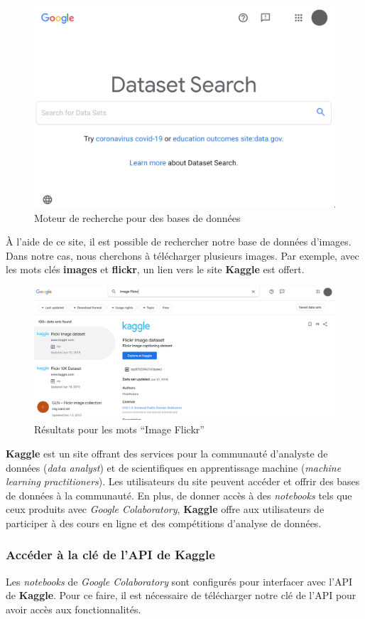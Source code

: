 \documentclass{article}
\begin{document}
\begin{figure}[H]
  \centering
  \includegraphics[width=0.5\columnwidth]{figures/googledataset}
  \caption{Moteur de recherche pour des bases de données}
  \label{fig:googleds}
\end{figure}

\bigbreak
À l'aide de ce site, il est possible de rechercher notre base de données d'images.
\bigbreak
Dans notre cas, nous cherchons à télécharger plusieurs images. Par exemple, avec les mots clés \textbf{images} et \textbf{flickr}, un lien vers le site \textbf{Kaggle} est offert.

\bigbreak
\begin{figure}[H]
  \centering
  \includegraphics[width=0.5\columnwidth]{figures/flickr_result}
  \caption{Résultats pour les mots ``Image Flickr''}
  \label{fig:image_flickr}
\end{figure}

\bigbreak
\textbf{Kaggle} est un site offrant des services pour la communauté d'analyste de données (\textit{data analyst}) et de scientifiques en apprentissage machine (\textit{machine learning practitioners}). Les utilisateurs du site peuvent accéder et offrir des bases de données à la communauté. En plus, de donner accès à des \textit{notebooks} tels que ceux produits avec \textit{Google Colaboratory}, \textbf{Kaggle} offre aux utilisateurs de participer à des cours en ligne et des compétitions d'analyse de données.

\subsubsection{Accéder à la clé de l'API de Kaggle}
Les \textit{notebooks} de \textit{Google Colaboratory} sont configurés pour interfacer avec l'API de \textbf{Kaggle}. Pour ce faire, il est nécessaire de télécharger notre clé de l'API pour avoir accès aux fonctionnalités.
\end{document}
